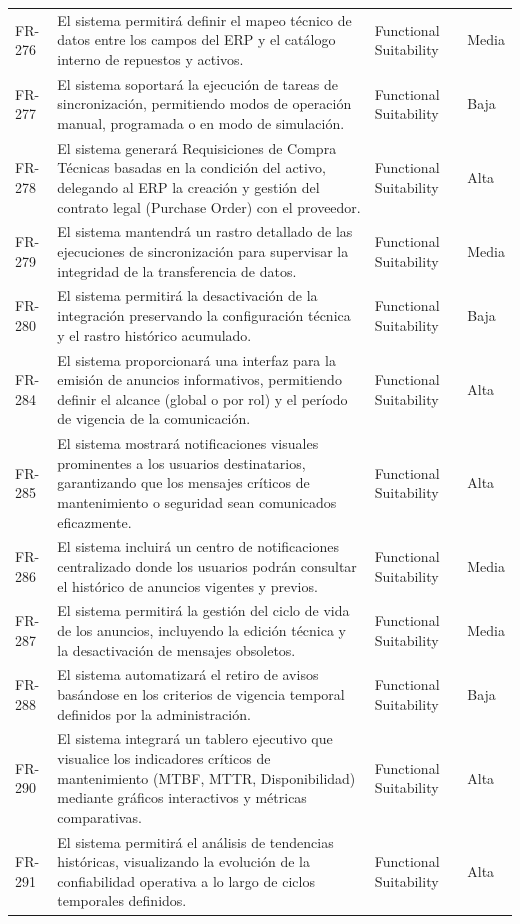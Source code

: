 \begin{longtable}{>{\raggedright\arraybackslash}p{} >{\raggedright\arraybackslash}p{} >{\raggedright\arraybackslash}p{} >{\raggedright\arraybackslash}p{}}
FR-276 & El sistema permitirá definir el mapeo técnico de datos entre los campos del ERP y el catálogo interno de repuestos y activos. & Functional Suitability & Media \\
FR-277 & El sistema soportará la ejecución de tareas de sincronización, permitiendo modos de operación manual, programada o en modo de simulación. & Functional Suitability & Baja \\
FR-278 & El sistema generará Requisiciones de Compra Técnicas basadas en la condición del activo, delegando al ERP la creación y gestión del contrato legal (Purchase Order) con el proveedor. & Functional Suitability & Alta \\
FR-279 & El sistema mantendrá un rastro detallado de las ejecuciones de sincronización para supervisar la integridad de la transferencia de datos. & Functional Suitability & Media \\
FR-280 & El sistema permitirá la desactivación de la integración preservando la configuración técnica y el rastro histórico acumulado. & Functional Suitability & Baja \\
FR-284 & El sistema proporcionará una interfaz para la emisión de anuncios informativos, permitiendo definir el alcance (global o por rol) y el período de vigencia de la comunicación. & Functional Suitability & Alta \\
FR-285 & El sistema mostrará notificaciones visuales prominentes a los usuarios destinatarios, garantizando que los mensajes críticos de mantenimiento o seguridad sean comunicados eficazmente. & Functional Suitability & Alta \\
FR-286 & El sistema incluirá un centro de notificaciones centralizado donde los usuarios podrán consultar el histórico de anuncios vigentes y previos. & Functional Suitability & Media \\
FR-287 & El sistema permitirá la gestión del ciclo de vida de los anuncios, incluyendo la edición técnica y la desactivación de mensajes obsoletos. & Functional Suitability & Media \\
FR-288 & El sistema automatizará el retiro de avisos basándose en los criterios de vigencia temporal definidos por la administración. & Functional Suitability & Baja \\
FR-290 & El sistema integrará un tablero ejecutivo que visualice los indicadores críticos de mantenimiento (MTBF, MTTR, Disponibilidad) mediante gráficos interactivos y métricas comparativas. & Functional Suitability & Alta \\
FR-291 & El sistema permitirá el análisis de tendencias históricas, visualizando la evolución de la confiabilidad operativa a lo largo de ciclos temporales definidos. & Functional Suitability & Alta \\

\end{longtable}
